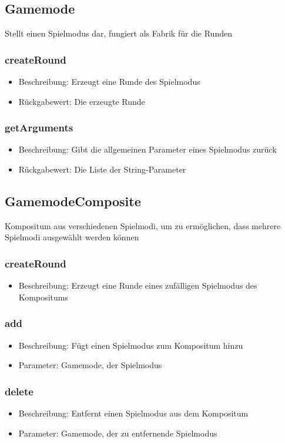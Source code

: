 \documentclass[a4paper]{scrreprt}
\begin{document}
	\subsection{Gamemode}
	Stellt einen Spielmodus dar, fungiert als Fabrik für die Runden
	\subsubsection{createRound}
	\begin{itemize}
		\item Beschreibung: Erzeugt eine Runde des Spielmodus
		\item Rückgabewert: Die erzeugte Runde
	\end{itemize}
	\subsubsection{getArguments}
	\begin{itemize}
		\item Beschreibung: Gibt die allgemeinen Parameter eines Spielmodus zurück
		\item Rückgabewert: Die Liste der String-Parameter %
	\end{itemize}
	
	\subsection{GamemodeComposite}
	Kompositum aus verschiedenen Spielmodi, um zu ermöglichen, dass mehrere Spielmodi ausgewählt werden können
	\subsubsection{createRound}
	\begin{itemize}
		\item Beschreibung: Erzeugt eine Runde eines zufälligen Spielmodus des Kompositums
	\end{itemize}
	\subsubsection{add}
	\begin{itemize}
		\item Beschreibung: Fügt einen Spielmodus zum Kompositum hinzu
		\item Parameter: Gamemode, der Spielmodus
	\end{itemize}
	\subsubsection{delete}
	\begin{itemize}
		\item Beschreibung: Entfernt einen Spielmodus aus dem Kompositum
		\item Parameter: Gamemode, der zu entfernende Spielmodus
	\end{itemize}
	
\end{document}
